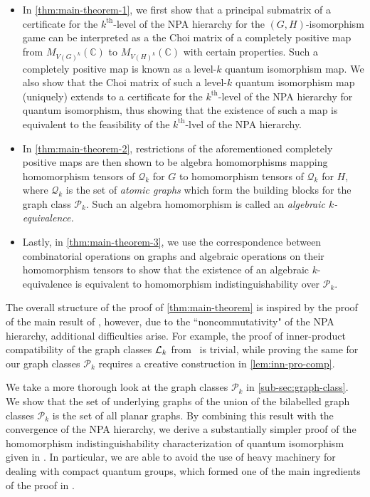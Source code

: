 \documentclass[a4paper,onecolumn,11pt,accepted=2026-01-06]{quantumarticle}
\theoremstyle{plain}
\theoremstyle{remark}
\theoremstyle{definition}
\newcommand{\complex}{\mathbb{C}}
\def\calP{{\mathcal P}} \def\calQ{{\mathcal Q}} \def\calR{{\mathcal R}}
\begin{document}
\begin{itemize}
    \item In \cref{thm:main-theorem-1}, we first show that a principal submatrix of a certificate for the $k^{\text{th}}$-level of the NPA hierarchy for the $(G,H)$-isomorphism game can be interpreted as a the Choi matrix of a completely positive map from $M_{V(G)^k}(\complex)$ to $M_{V(H)^k}(\complex)$ with certain properties. Such a completely positive map is known as a level-$k$ quantum isomorphism map. We also show that the Choi matrix of such a level-$k$ quantum isomorphism map (uniquely) extends to a certificate for the $k^{\text{th}}$-level of the NPA hierarchy for quantum isomorphism, thus showing that the existence of such a map is equivalent to the feasibility of the $k^{\text{th}}$-lvel of the NPA hierarchy.  

    \item In \cref{thm:main-theorem-2}, restrictions of the aforementioned completely positive maps are then shown to be algebra homomorphisms mapping homomorphism tensors of $\calQ_k$ for $G$ to homomorphism tensors of $\calQ_k$ for $H$, where $\calQ_k$ is the set of \emph{atomic graphs} which form the building blocks for the graph class $\calP_k$. Such an algebra homomorphism is called an \emph{algebraic $k$-equivalence.}

    \item Lastly, in \cref{thm:main-theorem-3}, we use the correspondence between combinatorial operations on graphs and algebraic operations on their homomorphism tensors to show that the existence of an algebraic $k$-equivalence is equivalent to homomorphism indistinguishability over $\calP_k$.  
\end{itemize}

The overall structure of the proof of \cref{thm:main-theorem} is inspired by the proof of the main result of \cite{roberson-seppelt-arxiv}, however, due to the ``noncommutativity" of the NPA hierarchy, additional difficulties arise. For example, the proof of inner-product compatibility of the graph classes ${\mathcal L}_k$ from~\cite{roberson-seppelt-arxiv} is trivial, while proving the same for our graph classes $\calP_k$ requires a creative construction in \cref{lem:inn-pro-comp}.    

We take a more thorough look at the graph classes $\calP_k$ in \cref{sub-sec:graph-class}. We show that the set of underlying graphs of the union of the bilabelled graph classes $\calP_k$ is the set of all planar graphs. By combining this result with the convergence of the NPA hierarchy, 
we derive a substantially simpler proof of the homomorphism indistinguishability characterization of quantum isomorphism given in \cite{david-laura}. 
In particular, we are able to avoid the use of heavy machinery for dealing with compact quantum groups, which formed one of the main ingredients of the proof in \cite{david-laura}.   
\end{document}

